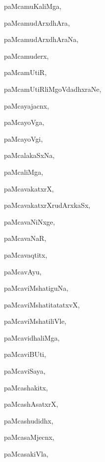 \begin{multicols}{3}
{\noindent
{paMcamuKaliMga}, \pageref{paMcamuKaliMga}

\noindent
{paMcamudArxdhAra}, \pageref{paMcamudArxdhAra}

\noindent
{paMcamudArxdhAraNa}, \pageref{paMcamudArxdhAraNa}

\noindent
{paMcamuderx}, \pageref{paMcamuderx}

\noindent
{paMcamUtiR}, \pageref{paMcamUtiR}

\noindent
{paMcamUtiRliMgoVdadhxraNe}, \pageref{paMcamUtiRliMgoVdadhxraNe}

\noindent
{paMcayajacnx}, \pageref{paMcayajacnx}

\noindent
{paMcayoVga}, \pageref{paMcayoVga}

\noindent
{paMcayoVgi}, \pageref{paMcayoVgi}

\noindent
{paMcalakaSxNa}, \pageref{paMcalakaSxNa}

\noindent
{paMcaliMga}, \pageref{paMcaliMga}

\noindent
{paMcavakatxrX}, \pageref{paMcavakatxrX}

\noindent
{paMcavakatxrXrudArxkaSx}, \pageref{paMcavakatxrXrudArxkaSx}

\noindent
{paMcavaNiNxge}, \pageref{paMcavaNiNxge}

\noindent
{paMcavaNaR}, \pageref{paMcavaNaR}

\noindent
{paMcavaqtitx}, \pageref{paMcavaqtitx}

\noindent
{paMcavAyu}, \pageref{paMcavAyu}

\noindent
{paMcaviMshatiguNa}, \pageref{paMcaviMshatiguNa}

\noindent
{paMcaviMshatitatatxvX}, \pageref{paMcaviMshatitatatxvX}

\noindent
{paMcaviMshatiliVle}, \pageref{paMcaviMshatiliVle}

\noindent
{paMcavidhaliMga}, \pageref{paMcavidhaliMga}

\noindent
{paMcaviBUti}, \pageref{paMcaviBUti}

\noindent
{paMcaviSaya}, \pageref{paMcaviSaya}

\noindent
{paMcashakitx}, \pageref{paMcashakitx}

\noindent
{paMcashAsatxrX}, \pageref{paMcashAsatxrX}

\noindent
{paMcashudidhx}, \pageref{paMcashudidhx}

\noindent
{paMcasaMjecnx}, \pageref{paMcasaMjecnx}

\noindent
{paMcasakiVla}, \pageref{paMcasakiVla}

}
\end{multicols}
